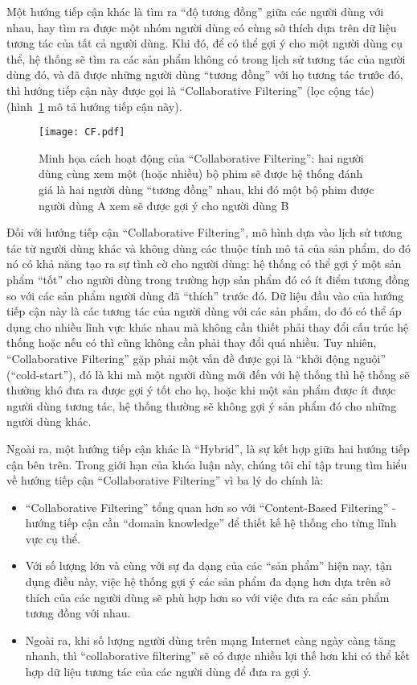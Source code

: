 Một hướng tiếp cận khác là tìm ra ``độ tương đồng'' giữa các người dùng với nhau, hay tìm ra được một nhóm người dùng
có cùng sở thích dựa trên dữ liệu tương tác của tất cả người dùng. Khi đó, để có thể gợi ý cho một người dùng cụ thể,
hệ thống sẽ tìm ra các sản phẩm không có trong lịch sử tương tác của người dùng đó, và đã được những người dùng ``tương đồng'' với họ tương tác trước đó,
thì hướng tiếp cận này được gọi là ``Collaborative Filtering'' (lọc cộng tác) (hình~\ref{fig_CF} mô tả hướng tiếp cận này).
\begin{figure}
    \centering
    \texttt{[image: CF.pdf]}
    \caption{Minh họa cách hoạt động của ``Collaborative Filtering'': hai người dùng cùng xem một (hoặc nhiều) bộ phim 
    sẽ được hệ thống đánh giá là hai người dùng ``tương đồng'' nhau, khi đó một bộ phim được
    người dùng A xem sẽ được gợi ý cho người dùng B}
    \label{fig_CF}
\end{figure}
Đối với hướng tiếp cận ``Collaborative Filtering'', mô hình dựa vào lịch sử tương tác từ người dùng khác
và không dùng các thuộc tính mô tả của sản phẩm, do đó nó có khả năng tạo ra sự tình cờ cho người dùng:
hệ thống có thể gợi ý một sản phẩm ``tốt'' cho người dùng trong trường hợp sản phẩm đó có ít điểm tương đồng
so với các sản phẩm người dùng đã ``thích'' trước đó. Dữ liệu đầu vào của hướng tiếp cận này là các tương tác
của người dùng với các sản phẩm, do đó có thể áp dụng cho nhiều lĩnh vực khác nhau mà không cần thiết phải thay đổi cấu trúc hệ thống 
hoặc nếu có thì cũng không cần phải thay đổi quá nhiều.
Tuy nhiên, ``Collaborative Filtering'' gặp phải một vấn đề được gọi là ``khởi động nguội'' (``cold-start''),
đó là khi mà một người dùng mới đến với hệ thống thì hệ thống sẽ thường khó đưa ra được gợi ý tốt cho họ,
hoặc khi một sản phẩm được ít được người dùng tương tác, hệ thống thường sẽ không gợi ý sản phẩm đó cho những người dùng khác.

Ngoài ra, một hướng tiếp cận khác là ``Hybrid'', là sự kết hợp giữa hai hướng tiếp cận bên trên.
Trong giới hạn của khóa luận này, chúng tôi chỉ tập trung tìm hiểu về hướng tiếp cận ``Collaborative Filtering'' 
vì ba lý do chính là:
\begin{itemize}
\item ``Collaborative Filtering'' tổng quan hơn so với ``Content-Based Filtering''
- hướng tiếp cận cần ``domain knowledge'' để thiết kế hệ thống cho từng lĩnh vực cụ thể.
\item Với số lượng lớn và cùng với sự đa dạng của các ``sản phẩm'' hiện nay, tận dụng điều này, 
việc hệ thống gợi ý các sản phẩm đa dạng hơn dựa trên sở thích của các người dùng sẽ phù hợp hơn so với việc
đưa ra các sản phẩm tương đồng với nhau.
\item Ngoài ra, khi số lượng người dùng trên mạng Internet càng ngày càng tăng nhanh, thì ``collaborative filtering'' 
sẽ có được nhiều lợi thế hơn khi có thể kết hợp dữ liệu tương tác của các người dùng để đưa ra gợi ý.
\end{itemize}

